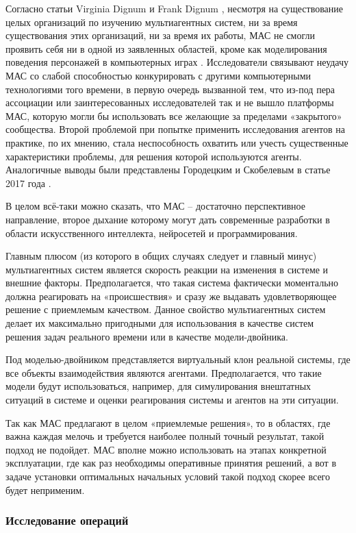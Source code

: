 Согласно статьи Virginia Dignum и Frank Dignum \cite{vfdignum}, несмотря на существование целых организаций по изучению мультиагентных систем, ни за время существования этих организаций, ни за время их работы, МАС не смогли проявить себя ни в одной из заявленных областей, кроме как моделирования поведения персонажей в компьютерных играх \cite{masgames}. Исследователи связывают неудачу МАС со слабой способностью конкурировать с другими компьютерными технологиями того времени, в первую очередь вызванной тем, что из-под пера ассоциации или заинтересованных исследователей так и не вышло платформы МАС, которую могли бы использовать все желающие за пределами «закрытого» сообщества. Второй проблемой при попытке применить исследования агентов на практике, по их мнению, стала неспособность охватить или учесть существенные характеристики проблемы, для решения которой используются агенты. Аналогичные выводы были представлены Городецким и Скобелевым в статье 2017 года \cite{massuck}.

В целом всё-таки можно сказать, что МАС – достаточно перспективное направление, второе дыхание которому могут дать современные разработки в области искусственного интеллекта, нейросетей и программирования.

Главным плюсом (из которого в общих случаях следует и главный минус) мультиагентных систем является скорость реакции на изменения в системе и внешние факторы. Предполагается, что такая система фактически моментально должна реагировать на «происшествия» и сразу же выдавать удовлетворяющее решение с приемлемым качеством. Данное свойство мультиагентных систем делает их максимально пригодными для использования в качестве систем решения задач реального времени или в качестве модели-двойника.

Под моделью-двойником представляется виртуальный клон реальной системы, где все объекты взаимодействия являются агентами. Предполагается, что такие модели будут использоваться, например, для симулирования внештатных ситуаций в системе и оценки реагирования системы и агентов на эти ситуации. 

Так как МАС предлагают в целом «приемлемые решения», то в областях, где важна каждая мелочь и требуется наиболее полный точный результат, такой подход не подойдет. МАС вполне можно использовать на этапах конкретной эксплуатации, где как раз необходимы оперативные принятия решений, а вот в задаче установки оптимальных начальных условий такой подход скорее всего будет неприменим.

\subsubsection{Исследование операций}

